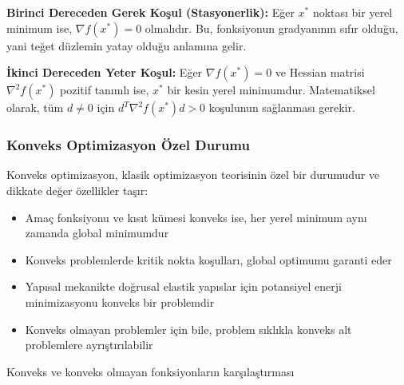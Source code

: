 \textbf{Birinci Dereceden Gerek Koşul (Stasyonerlik):} 
Eğer $x^*$ noktası bir yerel minimum ise, $\nabla f(x^*) = 0$ olmalıdır. Bu, fonksiyonun gradyanının sıfır olduğu, yani teğet düzlemin yatay olduğu anlamına gelir.

\textbf{İkinci Dereceden Yeter Koşul:} 
Eğer $\nabla f(x^*) = 0$ ve Hessian matrisi $\nabla^2 f(x^*)$ pozitif tanımlı ise, $x^*$ bir kesin yerel minimumdur. Matematiksel olarak, tüm $d \neq 0$ için $d^T \nabla^2 f(x^*) d > 0$ koşulunun sağlanması gerekir.



\subsubsection{Konveks Optimizasyon Özel Durumu}

Konveks optimizasyon, klasik optimizasyon teorisinin özel bir durumudur ve dikkate değer özellikler taşır:

\begin{itemize}
    \item Amaç fonksiyonu ve kısıt kümesi konveks ise, her yerel minimum aynı zamanda global minimumdur
    \item Konveks problemlerde kritik nokta koşulları, global optimumu garanti eder
    \item Yapısal mekanikte doğrusal elastik yapıslar için potansiyel enerji minimizasyonu konveks bir problemdir
    \item Konveks olmayan problemler için bile, problem sıklıkla konveks alt problemlere ayrıştırılabilir
\end{itemize}

\begin{marginfigure}
\centering
{}
\caption{Konveks ve konveks olmayan fonksiyonların karşılaştırması}
\label{fig:convexity}
\end{marginfigure}

